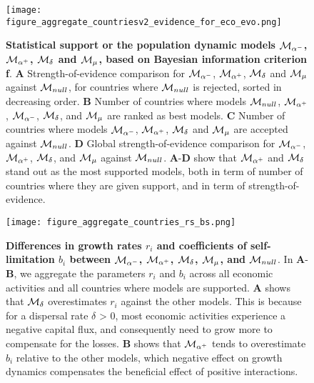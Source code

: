\begin{figure}
  \center
  \texttt{[image: figure\_aggregate\_countriesv2\_evidence\_for\_eco\_evo.png]}
  \caption{\small \textbf{Statistical support or the population dynamic models $\mathcal{M}_{\alpha^-}$, $\mathcal{M}_{\alpha^+}$, $\mathcal{M}_\delta$ and $\mathcal{M}_\mu$, based on Bayesian information criterion f}. 
  \textbf{A} Strength-of-evidence comparison for $\mathcal{M}_{\alpha^-}$, $\mathcal{M}_{\alpha^+}$, $\mathcal{M}_\delta$ and $\mathcal{M}_\mu$ against $\mathcal{M}_{null}$, for countries where $\mathcal{M}_{null}$ is rejected, sorted in decreasing order. 
  \textbf{B} Number of countries where models $\mathcal{M}_{null}$, $\mathcal{M}_{\alpha^+}$, $\mathcal{M}_{\alpha^-}$, $\mathcal{M}_\delta$, and $\mathcal{M}_\mu$ are ranked as best models. 
  \textbf{C} Number of countries where models $\mathcal{M}_{\alpha^-}$, $\mathcal{M}_{\alpha^+}$, $\mathcal{M}_\delta$ and $\mathcal{M}_\mu$ are accepted against $\mathcal{M}_{null}$.
  \textbf{D} Global strength-of-evidence comparison for $\mathcal{M}_{\alpha^-}$, $\mathcal{M}_{\alpha^+}$, $\mathcal{M}_\delta$, and $\mathcal{M}_\mu$ against $\mathcal{M}_{null}$.
  \textbf{A}-\textbf{D} show that $\mathcal{M}_{\alpha^+}$ and $\mathcal{M}_\delta$ stand out as the most supported models, both in term of number of countries where they are given support, and in term of strength-of-evidence.
  }\label{fig:aggregate_countries}
\end{figure}
\FloatBarrier




\begin{figure}
  \center
  \texttt{[image: figure\_aggregate\_countries\_rs\_bs.png]}
  \caption{\small \textbf{Differences in growth rates $r_i$ and coefficients of self-limitation $b_i$ between $\mathcal{M}_{\alpha^-}$, $\mathcal{M}_{\alpha^+}$, $\mathcal{M}_\delta$, $\mathcal{M}_\mu$, and $\mathcal{M}_{null}$}. In \textbf{A}-\textbf{B}, we aggregate the parameters $r_i$ and $b_i$ across all economic activities and all countries where models are supported. \textbf{A} shows that $\mathcal{M}_\delta$ overestimates $r_i$ against the other models. This is because for a dispersal rate $\delta$ > 0, most economic activities experience a negative capital flux, and consequently need to grow more to compensate for the losses. \textbf{B} shows that $\mathcal{M}_{\alpha^+}$ tends to overestimate $b_i$ relative to the other models, which negative effect on growth dynamics compensates the beneficial effect of positive interactions.
   }\label{fig:r_b}
\end{figure}
\FloatBarrier


